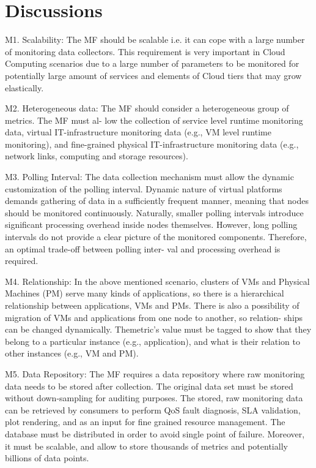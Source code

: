 \section{Discussions}

M1. Scalability: The MF should be scalable i.e. it can cope with a large number of monitoring data collectors. This requirement is very important in Cloud Computing scenarios due to a large number of parameters to be monitored for potentially large amount of services and elements of Cloud tiers that may grow elastically. 

M2. Heterogeneous data: The MF should consider a heterogeneous group of metrics. The MF must al- low the collection of service level runtime monitoring data, virtual IT-infrastructure monitoring data (e.g., VM level runtime monitoring), and fine-grained physical IT-infrastructure monitoring data (e.g., network links, computing and storage resources). 

M3. Polling Interval: The data collection mechanism must allow the dynamic customization of the polling interval. Dynamic nature of virtual platforms demands gathering of data in a sufficiently frequent manner, meaning that nodes should be monitored continuously. Naturally, smaller polling intervals introduce significant processing overhead inside nodes themselves. However, long polling intervals do not provide a clear picture of the monitored components. Therefore, an optimal trade-off between polling inter- val and processing overhead is required. 

M4. Relationship: In the above mentioned scenario, clusters of VMs and Physical Machines (PM) serve many kinds of applications, so there is a hierarchical relationship between applications, VMs and PMs.
There is also a possibility of migration of VMs and applications from one node to another, so relation- ships can be changed dynamically. Themetric’s value must be tagged to show that they belong to a particular instance (e.g., application), and what is their relation to other instances (e.g., VM and PM). 

M5. Data Repository: The MF requires a data repository where raw monitoring data needs to be stored after collection. The original data set must be stored without down-sampling for auditing purposes. The stored, raw monitoring data can be retrieved by consumers to perform QoS fault diagnosis, SLA validation, plot rendering, and as an input for fine grained resource management. The database must be distributed in order to avoid single point of failure. Moreover, it must be scalable, and allow to store thousands of metrics and potentially billions of data points. 

